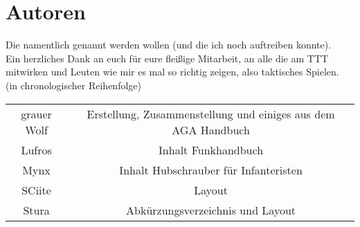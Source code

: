 \newpage
\section{Autoren}
Die namentlich genannt werden wollen (und die ich noch auftreiben konnte). \\
Ein herzliches Dank an euch für eure fleißige Mitarbeit, an alle die am TTT mitwirken und Leuten wie mir es mal so richtig zeigen, also taktisches Spielen. \\
(in chronologischer Reihenfolge) \\

\begin{tabular}{cc}
grauer Wolf  & Erstellung, Zusammenstellung und einiges aus dem AGA Handbuch \\
Lufros & Inhalt Funkhandbuch \\
Mynx &  Inhalt Hubschrauber für Infanteristen \\
SCiite & Layout  \\
Stura & Abkürzungsverzeichnis und Layout \\


\end{tabular}
